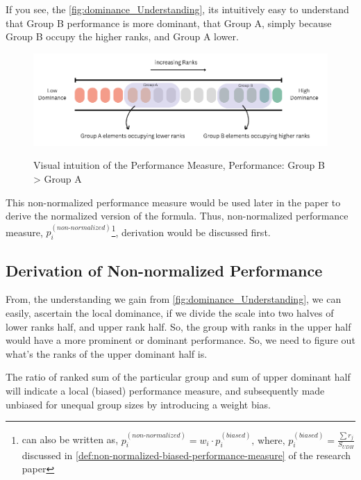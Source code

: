 \documentclass[a4paper,fleqn,review]{cas-sc}
\begin{document}
If you see, the \autoref{fig:dominance_Understanding}, its intuitively easy to understand that Group B performance is more dominant, that Group A, simply because Group B occupy the higher ranks, and Group A lower.
\begin{figure}
    \caption{Visual intuition of the Performance Measure, Performance: Group B > Group A}
    \centering
    \includegraphics[scale=0.65]{dominance-intuition.png}
    \label{fig:dominance_Understanding}
\end{figure}



This non-normalized performance measure would be used later in the paper to derive the normalized version of the formula. Thus, non-normalized performance measure, $p_i^{(non\text{-}normalized)}$\footnote{
	can also be written as, $p_i^{(non\text{-}normalized)} = w_i \cdot p_i^{(biased)} \text{, where, } p_i^{(biased)}= \frac{\sum r_j}{ S_{UDH} }$ discussed in \autoref{def:non-normalized-biased-performance-measure} of the research paper}, derivation would be discussed first.


\subsection{Derivation of Non-normalized Performance}

From, the understanding we gain from \autoref{fig:dominance_Understanding}, we can easily, ascertain the local dominance, if we divide the scale into two halves of lower ranks half, and upper rank half. So, the group with ranks in the upper half would have a more prominent or dominant performance. So, we need to figure out what's the ranks of the upper dominant half is.

\begin{pot}[\ref{def:non-normalized-performance-measure}]
	 The ratio of ranked sum of the particular group and sum of upper dominant half will indicate a local (biased) performance measure, and subsequently made unbiased for unequal group sizes by introducing a weight bias.
\end{pot}
\end{document}
